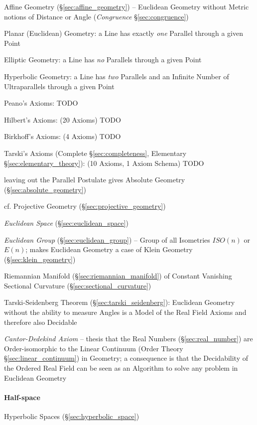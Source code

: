 Affine Geometry (\S\ref{sec:affine_geometry}) -- Euclidean Geometry without
Metric notions of Distance or Angle (\emph{Congruence} \S\ref{sec:congruence})

Planar (Euclidean) Geometry: a Line has exactly \emph{one} Parallel through a
given Point

\fist Elliptic Geometry: a Line has \emph{no} Parallels through a given Point

\fist Hyperbolic Geometry: a Line has \emph{two} Parallels and an Infinite
Number of Ultraparallels through a given Point

Peano's Axioms: TODO

Hilbert's Axioms: (20 Axioms) TODO

Birkhoff's Axioms: (4 Axioms) TODO

Tarski's Axioms (Complete \S\ref{sec:completeness}, Elementary
\S\ref{sec:elementary_theory}): (10 Axioms, 1 Axiom Schema) TODO

\fist leaving out the Parallel Postulate gives Absolute Geometry
(\S\ref{sec:absolute_geometry})

cf. Projective Geometry (\S\ref{sec:projective_geometry})

\emph{Euclidean Space} (\S\ref{sec:euclidean_space})

\emph{Euclidean Group} (\S\ref{sec:euclidean_group}) -- Group of all
Isometries $ISO(n)$ or $E(n)$; makes Euclidean Geometry a case of
Klein Geometry (\S\ref{sec:klein_geometry})

Riemannian Manifold (\S\ref{sec:riemannian_manifold}) of Constant Vanishing
Sectional Curvature (\S\ref{sec:sectional_curvature})

Tarski-Seidenberg Theorem (\S\ref{sec:tarski_seidenberg}): Euclidean Geometry
without the ability to measure Angles is a Model of the Real Field Axioms
and therefore also Decidable

\emph{Cantor-Dedekind Axiom} -- thesis that the Real Numbers
(\S\ref{sec:real_number}) are Order-isomorphic to the Linear Continuum (Order
Theory \S\ref{sec:linear_continuum}) in Geometry; a consequence is that the
Decidability of the Ordered Real Field can be seen as an Algorithm to solve any
problem in Euclidean Geometry



\paragraph{Half-space}\label{sec:half_space}\hfill

Hyperbolic Spaces (\S\ref{sec:hyperbolic_space})



